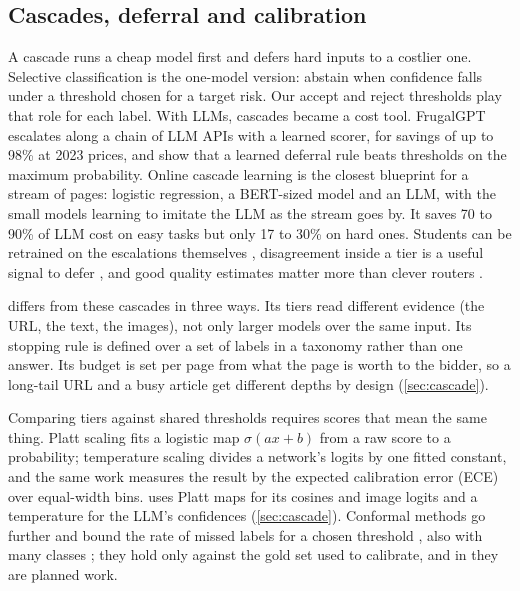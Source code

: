 \subsection{Cascades, deferral and calibration}\label{sec:related-cascade}

A cascade runs a cheap model first and defers hard inputs to a costlier one. Selective classification \citep{geifman2017selective} is the one-model version: abstain when confidence falls under a threshold chosen for a target risk. Our accept and reject thresholds play that role for each label. With LLMs, cascades became a cost tool. FrugalGPT \citep{chen2024frugalgpt} escalates along a chain of LLM APIs with a learned scorer, for savings of up to 98\% at 2023 prices, and \citet{gupta2024language} show that a learned deferral rule beats thresholds on the maximum probability. Online cascade learning \citep{nie2024online} is the closest blueprint for a stream of pages: logistic regression, a BERT-sized model and an LLM, with the small models learning to imitate the LLM as the stream goes by. It saves 70 to 90\% of LLM cost on easy tasks but only 17 to 30\% on hard ones. Students can be retrained on the escalations themselves \citep{ramirez2024cache}, disagreement inside a tier is a useful signal to defer \citep{kolawole2025agreement}, and good quality estimates matter more than clever routers \citep{dekoninck2025unified,li2026llmrouterbench}.

\sys{} differs from these cascades in three ways. Its tiers read different evidence (the URL, the text, the images), not only larger models over the same input. Its stopping rule is defined over a set of labels in a taxonomy rather than one answer. Its budget is set per page from what the page is worth to the bidder, so a long-tail URL and a busy article get different depths by design (\cref{sec:cascade}).

Comparing tiers against shared thresholds requires scores that mean the same thing. Platt scaling fits a logistic map $\sigma(ax+b)$ from a raw score to a probability; temperature scaling \citep{guo2017calibration} divides a network's logits by one fitted constant, and the same work measures the result by the expected calibration error (ECE) over equal-width bins. \sys{} uses Platt maps for its cosines and image logits and a temperature for the LLM's confidences (\cref{sec:cascade}). Conformal methods go further and bound the rate of missed labels for a chosen threshold \citep{bates2021distribution,angelopoulos2024conformal,angelopoulos2021learn}, also with many classes \citep{ding2023class}; they hold only against the gold set used to calibrate, and in \sys{} they are planned work.

